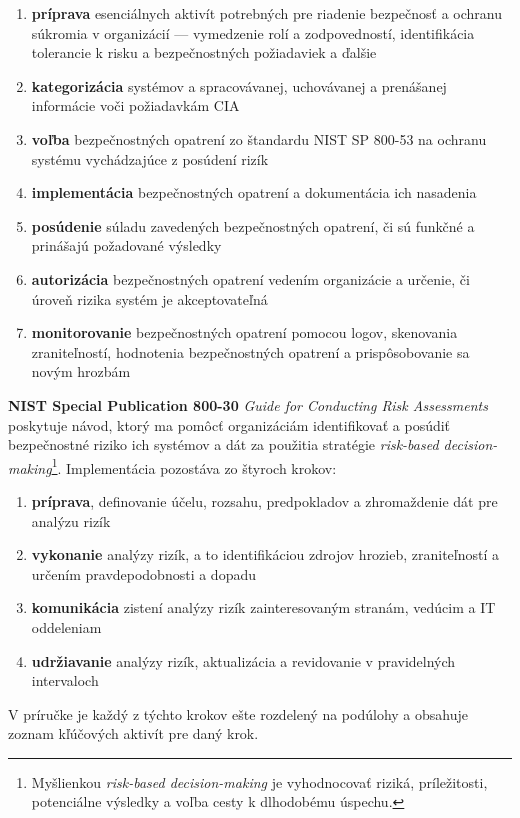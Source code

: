 \begin{enumerate}
    \item \textbf{príprava} esenciálnych aktivít potrebných pre riadenie bezpečnosť a ochranu súkromia v organizácií --- vymedzenie rolí a zodpovedností,
    identifikácia tolerancie k risku a bezpečnostných požiadaviek a ďalšie
    \item \textbf{kategorizácia} systémov a spracovávanej, uchovávanej a prenášanej informácie voči požiadavkám CIA
    \item \textbf{voľba} bezpečnostných opatrení zo štandardu NIST SP 800-53\cite{nist_sp_800_53} na ochranu systému vychádzajúce z posúdení rizík
    \item \textbf{implementácia} bezpečnostných opatrení a dokumentácia ich nasadenia
    \item \textbf{posúdenie} súladu zavedených bezpečnostných opatrení, či sú funkčné a prinášajú požadované výsledky
    \item \textbf{autorizácia} bezpečnostných opatrení vedením organizácie a určenie, či úroveň rizika systém je akceptovateľná
    \item \textbf{monitorovanie} bezpečnostných opatrení pomocou logov, skenovania zraniteľností, hodnotenia bezpečnostných opatrení a prispôsobovanie
    sa novým hrozbám
\end{enumerate}

\textbf{NIST Special Publication 800-30} \textit{Guide for Conducting Risk Assessments} poskytuje návod, ktorý ma pomôcť organizáciám identifikovať a
posúdiť bezpečnostné riziko ich systémov a dát za použitia stratégie \textit{risk-based decision-making}\footnote{Myšlienkou \textit{risk-based decision-making}
je vyhodnocovať riziká, príležitosti, potenciálne výsledky a voľba cesty k dlhodobému úspechu.}. Implementácia pozostáva zo štyroch krokov:
\begin{enumerate}
    \item \textbf{príprava}, definovanie účelu, rozsahu, predpokladov a zhromaždenie dát pre analýzu rizík
    \item \textbf{vykonanie} analýzy rizík, a to identifikáciou zdrojov hrozieb, zraniteľností a určením pravdepodobnosti a dopadu
    \item \textbf{komunikácia} zistení analýzy rizík zainteresovaným stranám, vedúcim a IT oddeleniam
    \item \textbf{udržiavanie} analýzy rizík, aktualizácia a revidovanie v pravidelných intervaloch
\end{enumerate}
V príručke je každý z týchto krokov ešte rozdelený na podúlohy a obsahuje zoznam kľúčových aktivít pre daný krok.

